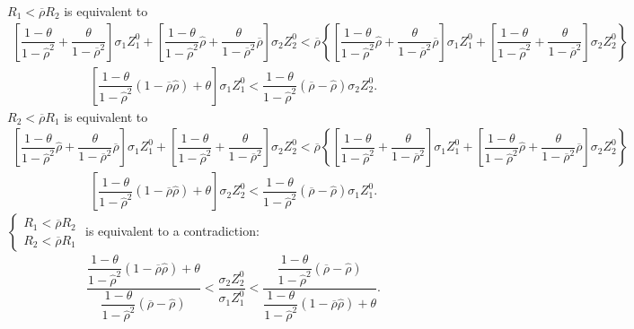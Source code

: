 \documentclass[10pt]{article}
\begin{document}
$ R_1 < \overline{\rho} R_2 $ is equivalent to 
{\footnotesize \begin{eqnarray*}
\left[ \dfrac{1 - \theta}{1 - {\hat \rho}^2} + \dfrac{\theta}{1 - \overline{\rho}^2} \right] \sigma_1 Z_1^0 + \left[ \dfrac{1 - \theta}{1 - {\hat \rho}^2} {\hat \rho} + \dfrac{\theta}{1 - \overline{\rho}^2} \overline{\rho} \right] \sigma_2 Z_2^0 < \overline{\rho} \left\{ \left[ \dfrac{1 - \theta}{1 - {\hat \rho}^2} {\hat \rho} + \dfrac{\theta}{1 - \overline{\rho}^2} \overline{\rho} \right] \sigma_1 Z_1^0 + \left[ \dfrac{1 - \theta}{1 - {\hat \rho}^2} + \dfrac{\theta}{1 - \overline{\rho}^2} \right] \sigma_2 Z_2^0 \right\}
\end{eqnarray*}}
\begin{eqnarray*}
\left[ \dfrac{1 - \theta}{1 - {\hat \rho}^2} (1 - \overline{\rho} {\hat \rho}) + \theta \right] \sigma_1 Z_1^0 < \dfrac{1 - \theta}{1 - {\hat \rho}^2} (\overline{\rho} - {\hat \rho}) \sigma_2 Z_2^0.
\end{eqnarray*}
$ R_2 < \overline{\rho} R_1 $ is equivalent to 
{\footnotesize \begin{eqnarray*}
\left[ \dfrac{1 - \theta}{1 - {\hat \rho}^2} {\hat \rho} + \dfrac{\theta}{1 - \overline{\rho}^2} \overline{\rho} \right] \sigma_1 Z_1^0 + \left[ \dfrac{1 - \theta}{1 - {\hat \rho}^2} + \dfrac{\theta}{1 - \overline{\rho}^2} \right] \sigma_2 Z_2^0 < \overline{\rho} \left\{ \left[ \dfrac{1 - \theta}{1 - {\hat \rho}^2} + \dfrac{\theta}{1 - \overline{\rho}^2} \right] \sigma_1 Z_1^0 + \left[ \dfrac{1 - \theta}{1 - {\hat \rho}^2} {\hat \rho} + \dfrac{\theta}{1 - \overline{\rho}^2} \overline{\rho} \right] \sigma_2 Z_2^0 \right\}
\end{eqnarray*}}
\begin{eqnarray*}
\left[ \dfrac{1 - \theta}{1 - {\hat \rho}^2} (1 - \overline{\rho} {\hat \rho}) + \theta \right] \sigma_2 Z_2^0 < \dfrac{1 - \theta}{1 - {\hat \rho}^2} (\overline{\rho} - {\hat \rho}) \sigma_1 Z_1^0.
\end{eqnarray*}
$ \left\{ \begin{matrix} R_1 < \overline{\rho} R_2 \\ R_2 < \overline{\rho} R_1 \end{matrix} \right. $ is equivalent to a contradiction:
\begin{eqnarray*}
\dfrac{\dfrac{1 - \theta}{1 - {\hat \rho}^2} (1 - \overline{\rho} {\hat \rho}) + \theta}{\dfrac{1 - \theta}{1 - {\hat \rho}^2} (\overline{\rho} - {\hat \rho})} < \dfrac{\sigma_2 Z_2^0}{\sigma_1 Z_1^0} < \dfrac{\dfrac{1 - \theta}{1 - {\hat \rho}^2} (\overline{\rho} - {\hat \rho})}{\dfrac{1 - \theta}{1 - {\hat \rho}^2} (1 - \overline{\rho} {\hat \rho}) + \theta}.
\end{eqnarray*}
\end{document}
